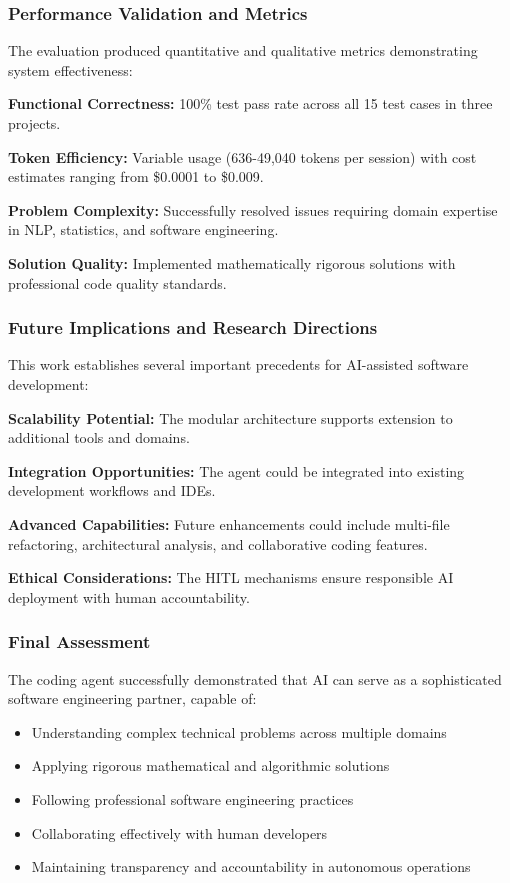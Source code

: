 \documentclass[12pt, a4paper]{article}
\begin{document}
\subsubsection{Performance Validation and Metrics}

The evaluation produced quantitative and qualitative metrics demonstrating system effectiveness:

\textbf{Functional Correctness:} 100\% test pass rate across all 15 test cases in three projects.

\textbf{Token Efficiency:} Variable usage (636-49,040 tokens per session) with cost estimates ranging from \$0.0001 to \$0.009.

\textbf{Problem Complexity:} Successfully resolved issues requiring domain expertise in NLP, statistics, and software engineering.

\textbf{Solution Quality:} Implemented mathematically rigorous solutions with professional code quality standards.

\subsubsection{Future Implications and Research Directions}

This work establishes several important precedents for AI-assisted software development:

\textbf{Scalability Potential:} The modular architecture supports extension to additional tools and domains.

\textbf{Integration Opportunities:} The agent could be integrated into existing development workflows and IDEs.

\textbf{Advanced Capabilities:} Future enhancements could include multi-file refactoring, architectural analysis, and collaborative coding features.

\textbf{Ethical Considerations:} The HITL mechanisms ensure responsible AI deployment with human accountability.

\subsubsection{Final Assessment}

The coding agent successfully demonstrated that AI can serve as a sophisticated software engineering partner, capable of:
\begin{itemize}
    \item Understanding complex technical problems across multiple domains
    \item Applying rigorous mathematical and algorithmic solutions
    \item Following professional software engineering practices
    \item Collaborating effectively with human developers
    \item Maintaining transparency and accountability in autonomous operations
\end{itemize}
\end{document}
